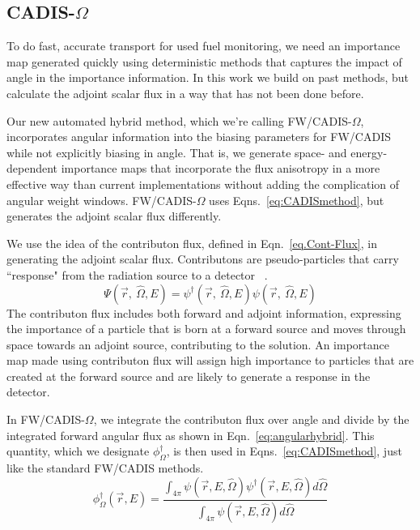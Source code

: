 \documentclass[12pt]{article}
\begin{document}
\subsection{CADIS-$\Omega$}
\label{sect::omega}
To do fast, accurate transport for used fuel monitoring, we need an importance map generated quickly using deterministic methods that captures the impact of angle in the importance information. 
In this work we build on past methods, but calculate the adjoint scalar flux in a way that has not been done before.

Our new automated hybrid method, which we're calling FW/CADIS-$\Omega$, incorporates angular information into the biasing parameters for FW/CADIS while not explicitly biasing in angle. 
That is, we generate space- and energy-dependent importance maps that incorporate the flux anisotropy in a more effective way than current implementations without adding the complication of angular weight windows. 
FW/CADIS-$\Omega$ uses Eqns.~\eqref{eq:CADISmethod}, but generates the adjoint scalar flux differently. 

We use the idea of the contributon flux, defined in Eqn.~\eqref{eq.Cont-Flux}, in generating the adjoint scalar flux. 
Contributons are pseudo-particles that carry ``response" from the radiation source to a detector ~\cite{williams_generalized_1991,williams_contributorn_1992,williams_contributon_study}. 
%
\begin{equation}
\Psi (\vec {r},\:\hat\Omega ,E) = \psi^{\dagger} (\vec {r},\:\hat\Omega ,E) \psi(\vec {r} ,\:\hat\Omega,E)
\label{eq.Cont-Flux} 
\end{equation}
%
The contributon flux includes both forward and adjoint information, expressing the importance of a particle that is born at a forward source and moves through space towards an adjoint source, contributing to the solution.
An importance map made using contributon flux will assign high importance to particles that are created at the forward source and are likely to generate a response in the detector. 

In FW/CADIS-$\Omega$, we integrate the contributon flux over angle and divide by the integrated forward angular flux as shown in Eqn.~\eqref{eq:angularhybrid}.
This quantity, which we designate $\phi^{\dagger}_{\Omega}$, is then used in Eqns.~\eqref{eq:CADISmethod}, just like the standard FW/CADIS methods.
%
\begin{equation} 
\phi^{\dagger}_{\Omega}(\vec{r},E) = \frac{\int_{4\pi} \psi(\vec {r} ,E,\hat{\Omega})\psi^{\dagger}(\vec {r} ,E,\hat{\Omega})d\hat\Omega }{\int_{4\pi}\psi(\vec {r} ,E,\hat{\Omega})d\hat\Omega}
\label{eq:angularhybrid}
\end{equation}
\end{document}
